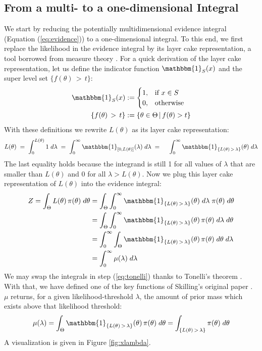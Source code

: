 \documentclass[12pt, a4paper]{report}
\begin{document}
\subsection{From a multi- to a one-dimensional Integral}
We start by reducing the potentially multidimensional evidence integral (Equation (\ref{eq:evidence})) to a one-dimensional integral.
To this end, we first replace the likelihood in the evidence integral by its layer cake representation, a tool borrowed from measure theory \cite[26]{liebloss}.
For a quick derivation of the layer cake representation, let us define the indicator function $\mathbbm{1}_S(x)$  and the super level set $\{f(\theta) \, > \, t\}$:
\begin{align*}
    \mathbbm{1}_S(x) &:= \begin{cases}
        1, & \textrm{if } x \in S \\
        0, & \textrm{otherwise}
    \end{cases} \\
    \{f(\theta) \, > \, t\} &:= \{ \theta \in \Theta \, | \, f(\theta) > t \}
\end{align*}
With these definitions we rewrite $L(\theta)$ as its layer cake representation:
\begin{align*}
    L(\theta) 
    \; = \; \int_0^{L(\theta)} 1 \; d\lambda
    \; = \; \int_0^{\infty} \mathbbm{1}_{[0,L(\theta)]}(\lambda) \; d\lambda
    \; = \; \quad \int_0^{\infty} \mathbbm{1}_{\{ L(\theta) \, > \, \lambda \}}(\theta) \; d\lambda 
\end{align*}
The last equality holds because the integrand is still 1 for all values of $\lambda$ that are smaller than $L(\theta)$ and 0 for all $\lambda > L(\theta)$.
Now we plug this layer cake representation of $L(\theta)$ into the evidence integral:
\begin{align}
    Z = \int_\Theta L(\theta) \, \pi(\theta) \; d\theta &= \int_{\Theta} \int_0^{\infty} \mathbbm{1}_{\{ L(\theta) \, > \, \lambda \}}(\theta) \; d\lambda \; \pi(\theta) \; d\theta \nonumber\\
    &= \int_\Theta \int_0^{\infty} \mathbbm{1}_{\{ L(\theta) \, > \, \lambda \}}(\theta) \, \pi(\theta) \; d\lambda \; d\theta \nonumber\\
    &= \int_0^{\infty} \int_\Theta \mathbbm{1}_{\{ L(\theta) \, > \, \lambda \}}(\theta) \, \pi(\theta) \; d\theta \; d\lambda \label{eq:tonelli}\\
    &= \int_0^{\infty} \mu(\lambda) \; d\lambda
    \label{eq:integral_2}
\end{align}
We may swap the integrals in step (\ref{eq:tonelli}) thanks to Tonelli's theorem \cite[147]{measure_theory}.
With that, we have defined one of the key functions of Skilling's original paper \cite{skilling}.
$\mu$ returns, for a given likelihood-threshold $\lambda$, the amount of prior mass which exists above that likelihood threshold:
\begin{align}
\mu(\lambda) 
= \int_\Theta \mathbbm{1}_{\{ L(\theta) \, > \, \lambda \}}(\theta) \, \pi(\theta) \; d\theta
= \int_{\{L(\theta) \,>\, \lambda\}} \pi(\theta) \; d\theta \label{eq:mu_definition}
\end{align}
A visualization is given in Figure \ref{fig:xlambda}.
\end{document}
